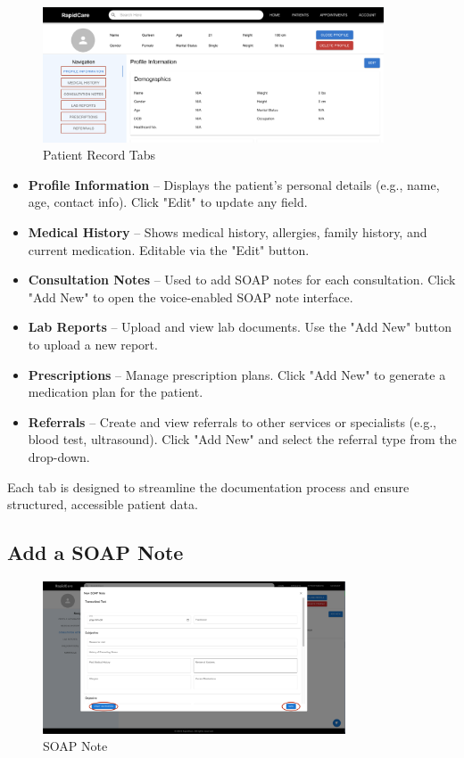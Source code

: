 \documentclass[12pt, titlepage]{article}
\begin{document}
\begin{figure}[H]
\centering
\includegraphics[width=0.9\textwidth]{patient.png}
\caption{Patient Record Tabs}
\label{fig:Patient Record Tabs}
\end{figure}
    
\begin{itemize}
    \item \textbf{Profile Information} – Displays the patient's personal details (e.g., name, age, contact info). Click "Edit" to update any field.
    \item \textbf{Medical History} – Shows medical history, allergies, family history, and current medication. Editable via the "Edit" button.
    \item \textbf{Consultation Notes} – Used to add SOAP notes for each consultation. Click "Add New" to open the voice-enabled SOAP note interface.
    \item \textbf{Lab Reports} – Upload and view lab documents. Use the "Add New" button to upload a new report.
    \item \textbf{Prescriptions} – Manage prescription plans. Click "Add New" to generate a medication plan for the patient.
    \item \textbf{Referrals} – Create and view referrals to other services or specialists (e.g., blood test, ultrasound). Click "Add New" and select the referral type from the drop-down.
\end{itemize}

Each tab is designed to streamline the documentation process and ensure structured, accessible patient data.

\subsection{Add a SOAP Note}

\begin{figure}[H]
\centering
\includegraphics[width=0.8\textwidth]{vtt.png}
\caption{SOAP Note}
\label{fig:SOAP Note}
\end{figure}
\end{document}
